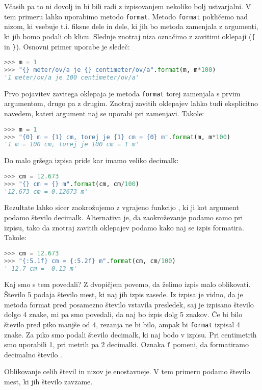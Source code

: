 Včasih pa to ni dovolj in bi bili radi z izpisovanjem nekoliko bolj ustvarjalni. V tem primeru lahko uporabimo metodo \texttt{format}. Metodo \texttt{format} pokličemo nad nizom, ki vsebuje t.i. fiksne dele in dele, ki jih bo metoda zamenjala z argumenti, ki jih bomo podali ob klicu. Slednje znotraj niza označimo z zavitimi oklepaji (\texttt{\{} in \texttt{\}}). Osnovni primer uporabe je sledeč:
\begin{lstlisting}[language=Python, showstringspaces=false]
>>> m = 1
>>> "{} meter/ov/a je {} centimeter/ov/a".format(m, m*100)
'1 meter/ov/a je 100 centimeter/ov/a'
\end{lstlisting}
Prvo pojavitev zavitega oklepaja je metoda \texttt{format} torej zamenjala s prvim argumentom, drugo pa z drugim. Znotraj zavitih oklepajev lahko tudi eksplicitno navedem, kateri argument naj se uporabi pri zamenjavi. Takole:
\begin{lstlisting}[language=Python, showstringspaces=false]
>>> m = 1
>>> "{0} m = {1} cm, torej je {1} cm = {0} m".format(m, m*100)
'1 m = 100 cm, torej je 100 cm = 1 m'
\end{lstlisting}
Do malo gršega izpisa pride kar imamo veliko decimalk:
\begin{lstlisting}[language=Python, showstringspaces=false]
>>> cm = 12.673
>>> "{} cm = {} m".format(cm, cm/100)
'12.673 cm = 0.12673 m'
\end{lstlisting}
Rezultate lahko sicer zaokrožujemo z vgrajeno funkcijo , ki ji kot argument podamo število decimalk. Alternativa je, da zaokroževanje podamo samo pri izpisu, tako da znotraj zavitih oklepajev podamo kako naj se izpis formatira. Takole:
\begin{lstlisting}[language=Python, showstringspaces=false]
>>> cm = 12.673
>>> "{:5.1f} cm = {:5.2f} m".format(cm, cm/100)
' 12.7 cm =  0.13 m'
\end{lstlisting}
Kaj smo s tem povedali? Z dvopičjem povemo, da želimo izpis malo oblikovati. Število 5 podaja število mest, ki naj jih izpis zasede. Iz izpisa je vidno, da je metoda format pred posamezno število vstavila presledek, saj je izpisano število dolgo 4 znake, mi pa smo povedali, da naj bo izpis dolg 5 znakov. Če bi bilo število pred piko manjše od 4, rezanja ne bi bilo, ampak bi \texttt{format} izpisal 4 znake. Za piko smo podali število decimalk, ki naj bodo v izpisu. Pri centimetrih smo uporabili 1, pri metrih pa 2 decimalki. Oznaka \texttt{f} pomeni, da formatiramo decimalno število .

Oblikovanje celih števil in nizov je enostavneje. V tem primeru podamo število mest, ki jih število zavzame. 

